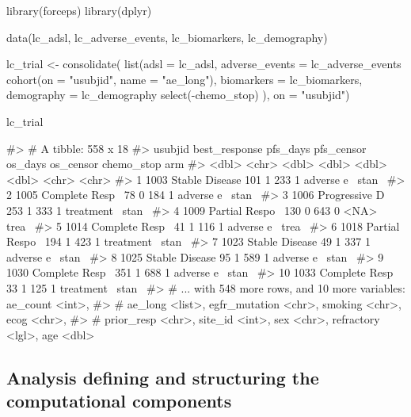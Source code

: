 \begin{Schunk}
\begin{Sinput}
library(forceps)
library(dplyr)

data(lc_adsl, lc_adverse_events, lc_biomarkers, lc_demography)

lc_trial <- consolidate(
  list(adsl = lc_adsl,
       adverse_events = lc_adverse_events %
         cohort(on = "usubjid", name = "ae_long"),
       biomarkers = lc_biomarkers,
       demography = lc_demography %
         select(-chemo_stop)
  ),
  on = "usubjid")

lc_trial
\end{Sinput}
\begin{Soutput}
#> # A tibble: 558 x 18
#>    usubjid best_response  pfs_days pfs_censor os_days os_censor chemo_stop arm  
#>      <dbl> <chr>             <dbl>      <dbl>   <dbl>     <dbl> <chr>      <chr>
#>  1    1003 Stable Disease      101          1     233         1 adverse e~ stan~
#>  2    1005 Complete Resp~       78          0     184         1 adverse e~ stan~
#>  3    1006 Progressive D~      253          1     333         1 treatment~ stan~
#>  4    1009 Partial Respo~      130          0     643         0 <NA>       trea~
#>  5    1014 Complete Resp~       41          1     116         1 adverse e~ trea~
#>  6    1018 Partial Respo~      194          1     423         1 treatment~ stan~
#>  7    1023 Stable Disease       49          1     337         1 adverse e~ stan~
#>  8    1025 Stable Disease       95          1     589         1 adverse e~ stan~
#>  9    1030 Complete Resp~      351          1     688         1 adverse e~ stan~
#> 10    1033 Complete Resp~       33          1     125         1 treatment~ stan~
#> # ... with 548 more rows, and 10 more variables: ae_count <int>,
#> #   ae_long <list>, egfr_mutation <chr>, smoking <chr>, ecog <chr>,
#> #   prior_resp <chr>, site_id <int>, sex <chr>, refractory <lgl>, age <dbl>
\end{Soutput}
\end{Schunk}

\hypertarget{analysis-defining-and-structuring-the-computational-components}{%
\subsection{Analysis defining and structuring the computational
components}\label{analysis-defining-and-structuring-the-computational-components}}

